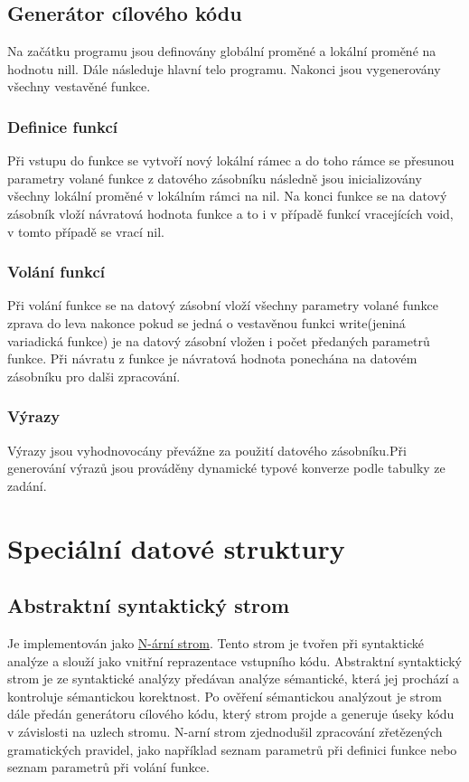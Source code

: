 \documentclass[a4paper, 11pt]{article}
\begin{document}
	\subsection{Generátor cílového kódu}
    Na začátku programu jsou definovány globální proměné a lokální proměné na hodnotu nill. Dále následuje hlavní telo programu. Nakonci jsou vygenerovány všechny
    vestavěné funkce.
    \subsubsection{Definice funkcí}
    Při vstupu do funkce se vytvoří nový lokální rámec a do toho rámce se přesunou parametry volané funkce z datového zásobníku následně jsou inicializovány všechny lokální
    proměné v lokálním rámci na nil. Na konci funkce se na datový zásobník
    vloží návratová hodnota funkce a to i v případě funkcí vracejících void, v tomto případě se vrací nil.
    \subsubsection{Volání funkcí}
    Při volání funkce se na datový zásobní vloží všechny parametry volané funkce zprava do leva nakonce pokud se jedná o vestavěnou funkci write(jeniná variadická funkce)
    je na datový zásobní vložen i počet předaných parametrů funkce. Při návratu z funkce je návratová hodnota ponechána na datovém zásobníku pro dalši zpracování.
    \subsubsection{Výrazy}
    Výrazy jsou vyhodnovocány převážne za použití datového zásobníku.Při generování výrazů jsou prováděny dynamické typové konverze podle tabulky ze zadání.
	
	\section{Speciální datové struktury}
	\subsection{Abstraktní syntaktický strom}
	\label{abstrtree}
	Je implementován jako \href{https://en.wikipedia.org/wiki/M-ary_tree}{N-ární strom}. Tento strom je tvořen při syntaktické analýze a slouží jako vnitřní 
	reprazentace vstupního kódu. Abstraktní syntaktický strom je ze syntaktické analýzy předávan analýze sémantické, která jej prochází a kontroluje 
	sémantickou korektnost. Po ověření sémantickou analýzout je strom dále předán generátoru cílového kódu, který strom projde a generuje úseky kódu v 
	závislosti na uzlech stromu. N-arní strom zjednodušil zpracování zřetězených gramatických pravidel, jako například seznam parametrů při definici funkce 
	nebo seznam parametrů při volání funkce.
\end{document}
